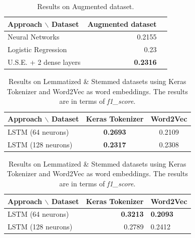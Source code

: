 \documentclass[11pt]{article}
\begin{document}
\begin{table}\small
	\centering
	\begin{tabular}{lrl}
		\hline \textbf{Approach $\backslash$ Dataset} & Augmented dataset \\ \hline
		Neural Networks                               & 0.2155            \\
		Logistic Regression                           & 0.23              \\
		U.S.E. + 2 dense layers                       & \textbf{0.2316}   \\
		\hline
	\end{tabular}
	\caption{\label{table3} Results on Augmented dataset. }
\end{table}

\begin{table}\small
	\centering
	\begin{subtable}{1\textwidth}
		\centering
		\begin{tabular}{lcc}
			\hline \textbf{Approach $\backslash$ Dataset} & Keras Tokenizer & Word2Vec \\ \hline
			LSTM (64 neurons)                             & \textbf{0.2693} & 0.2109   \\
			LSTM (128 neurons)                            & \textbf{0.2317} & 0.2308   \\
			\hline
		\end{tabular}
		\caption{Results on Lemmatized dataset with class weight}
	\end{subtable}
	\bigskip
	\begin{subtable}{1\textwidth}
		\centering
		\begin{tabular}{lrl}
			\hline \textbf{Approach $\backslash$ Dataset} & Keras Tokenizer & Word2Vec        \\ \hline
			LSTM (64 neurons)                             & \textbf{0.3213} & \textbf{0.2093} \\
			LSTM (128 neurons)                            & 0.2789          & 0.2412          \\
			\hline
		\end{tabular}
		\caption{Results on Stemmed dataset with class weight}
	\end{subtable}
	\caption{\label{table2} Results on Lemmatized \& Stemmed datasets using Keras Tokenizer and Word2Vec as word embeddings. The results are in terms of \textit{f1\_score}. }
\end{table}
\end{document}
